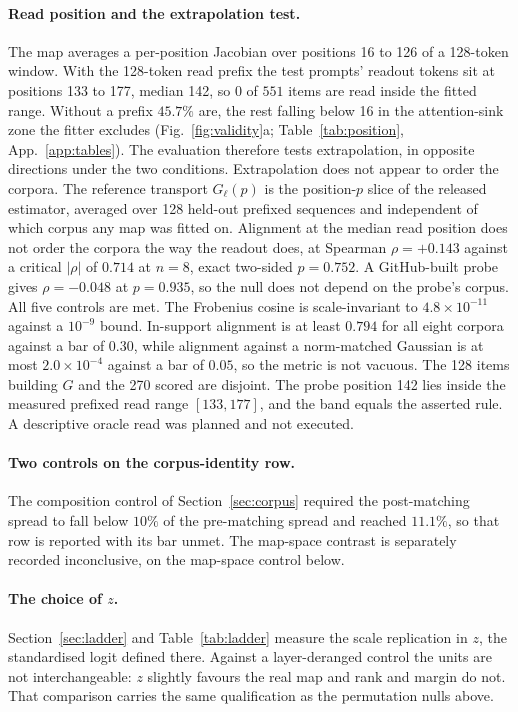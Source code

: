 \documentclass{article}
\begin{document}
\paragraph{Read position and the extrapolation test.} The map averages a per-position Jacobian
over positions 16 to 126 of a 128-token window. With the 128-token read prefix the test prompts' readout
tokens sit at positions 133 to 177, median 142, so $0$ of $551$ items are read inside the fitted
range. Without a prefix $45.7\%$ are, the rest falling below 16 in the attention-sink zone the
fitter excludes (Fig.~\ref{fig:validity}a; Table~\ref{tab:position}, App.~\ref{app:tables}). The
evaluation therefore tests extrapolation, in opposite directions under the two conditions.
Extrapolation does not appear to order the corpora. The reference transport $G_\ell(p)$ is the
position-$p$ slice of the released estimator, averaged over 128 held-out prefixed sequences and
independent of which corpus any map was fitted on. Alignment at the median read position does
not order the corpora the way the readout does, at Spearman $\rho=+0.143$ against a critical
$|\rho|$ of $0.714$ at $n{=}8$, exact two-sided $p=0.752$. A GitHub-built probe gives
$\rho=-0.048$ at $p=0.935$, so the null does not depend on the probe's corpus. All five controls are met. The Frobenius
cosine is scale-invariant to $4.8\times10^{-11}$ against a $10^{-9}$ bound. In-support alignment is
at least $0.794$ for all eight corpora against a bar of $0.30$, while alignment against a
norm-matched Gaussian is at most $2.0\times10^{-4}$ against a bar of $0.05$, so the metric is not
vacuous. The 128 items building $G$ and the 270 scored are disjoint. The probe position 142 lies inside the
measured prefixed read range $[133,177]$, and the band equals the asserted rule. A
descriptive oracle read was planned and not executed.

\paragraph{Two controls on the corpus-identity row.} The composition control of
Section~\ref{sec:corpus} required the post-matching spread to fall below $10\%$ of the pre-matching
spread and reached $11.1\%$, so that row is reported with its bar unmet. The map-space contrast
is separately recorded inconclusive, on the map-space control below.

\paragraph{The choice of $z$.} Section~\ref{sec:ladder} and Table~\ref{tab:ladder} measure the scale
replication in $z$, the standardised logit defined there. Against a layer-deranged control the units
are not interchangeable: $z$ slightly favours the real map and rank and margin do not. That
comparison carries the same qualification as the permutation nulls above.
\end{document}
